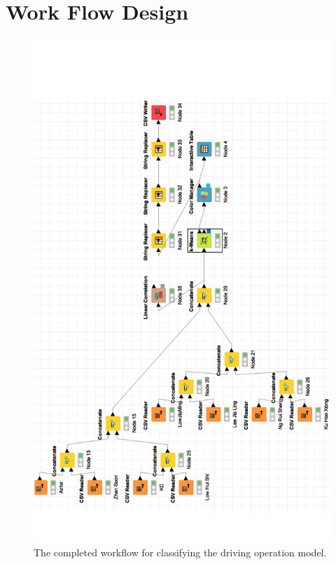 \chapter{Work Flow Design}
\begin{figure}[hbt!]\centering
\includegraphics[scale=0.6]{image/KNIMEfullwork}
\caption{The completed workflow for classifying the driving operation model.}
\end{figure}


